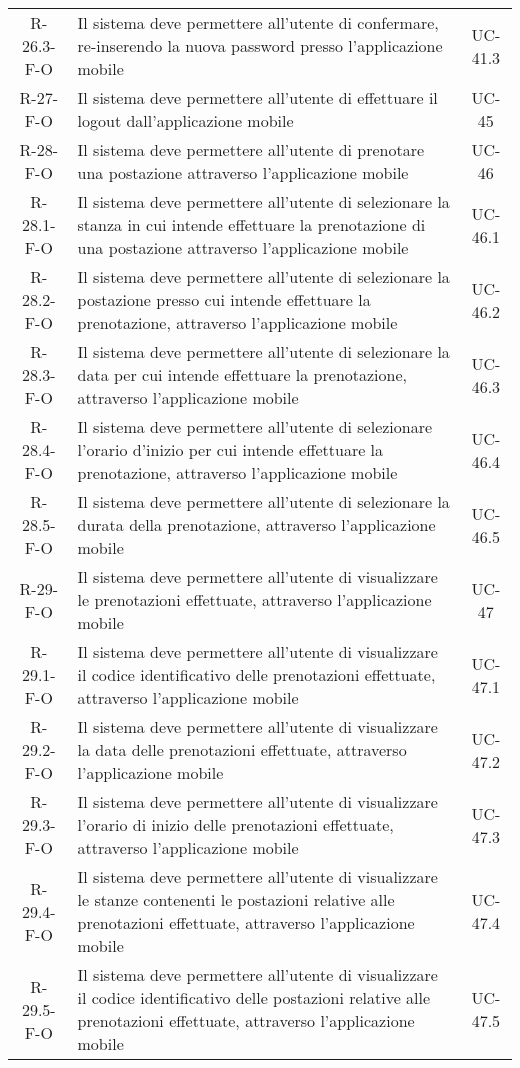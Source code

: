 \begin{longtable}{ c C{9.5cm} c }
    R-26.3-F-O & Il sistema deve permettere all'utente di confermare, re-inserendo la nuova password presso l'applicazione mobile& UC-41.3\\
    R-27-F-O & Il sistema deve permettere all'utente di effettuare il logout dall'applicazione mobile& UC-45\\
    R-28-F-O & Il sistema deve permettere all'utente di prenotare una postazione attraverso l'applicazione mobile& UC-46\\
    R-28.1-F-O & Il sistema deve permettere all'utente di selezionare la stanza in cui intende effettuare la prenotazione di una postazione attraverso l'applicazione mobile& UC-46.1\\
    R-28.2-F-O & Il sistema deve permettere all'utente di selezionare la postazione presso cui intende effettuare la prenotazione, attraverso l'applicazione mobile& UC-46.2\\
    R-28.3-F-O & Il sistema deve permettere all'utente di selezionare la data per cui intende effettuare la prenotazione, attraverso l'applicazione mobile& UC-46.3\\
    R-28.4-F-O & Il sistema deve permettere all'utente di selezionare l'orario d'inizio per cui intende effettuare la prenotazione, attraverso l'applicazione mobile& UC-46.4\\
    R-28.5-F-O & Il sistema deve permettere all'utente di selezionare la durata della prenotazione, attraverso l'applicazione mobile& UC-46.5\\
    R-29-F-O & Il sistema deve permettere all'utente di visualizzare le prenotazioni effettuate, attraverso l'applicazione mobile& UC-47\\
    R-29.1-F-O & Il sistema deve permettere all'utente di visualizzare il codice identificativo delle prenotazioni effettuate, attraverso l'applicazione mobile& UC-47.1\\
    R-29.2-F-O & Il sistema deve permettere all'utente di visualizzare la data delle prenotazioni effettuate, attraverso l'applicazione mobile& UC-47.2\\
    R-29.3-F-O & Il sistema deve permettere all'utente di visualizzare l'orario di inizio delle prenotazioni effettuate, attraverso l'applicazione mobile& UC-47.3\\
    R-29.4-F-O & Il sistema deve permettere all'utente di visualizzare le stanze contenenti le postazioni relative alle prenotazioni effettuate, attraverso l'applicazione mobile& UC-47.4\\
    R-29.5-F-O & Il sistema deve permettere all'utente di visualizzare il codice identificativo delle postazioni relative alle prenotazioni effettuate, attraverso l'applicazione mobile& UC-47.5\\

\end{longtable}
